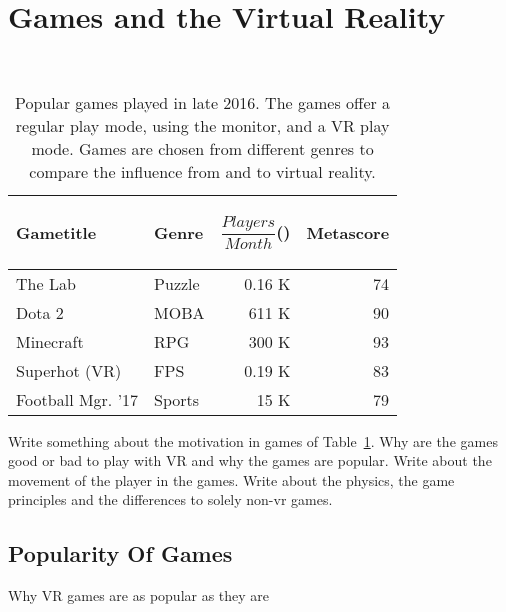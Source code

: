 
\section{Games and the Virtual Reality}

\begin{table}[h]
	\caption{Popular games played in late 2016. The games offer a regular play mode, using the monitor, and a VR play mode. Games are chosen from different genres to compare the influence from and to virtual reality.}~\label{tab:popularGames}
	
	\begin{tabular*}{\columnwidth}{ l l r r }
		Gametitle & Genre\footnotemark & \parbox[c][2.2em][t]{2cm}{\begin{flushright}$\dfrac{Players}{Month}$(\footnotemark)\end{flushright}} & Metascore\footnotemark \\
		\hline
		The Lab & Puzzle & 0.16 K & 74 \\
		Dota 2 & MOBA & 611 K & 90 \\
		Minecraft & RPG & 300 K & 93 \\
		Superhot (VR) & FPS & 0.19 K & 83 \\
		Football Mgr. '17 & Sports & 15 K & 79 \\
	\end{tabular*}
	
\end{table}



Write something about the motivation in games of Table~\ref{tab:popularGames}. Why are the games good or bad to play with VR and why the games are popular. Write about the movement of the player in the games. Write about the physics, the game principles and the differences to solely non-vr games.

\subsection{Popularity Of Games}
Why VR games are as popular as they are

